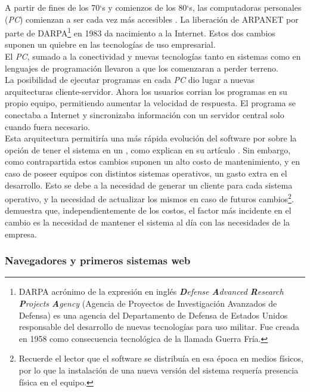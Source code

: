 A partir de fines de los 70`s y comienzos de los 80`s, las computadoras personales
(\emph{PC}) comienzan a ser cada vez más accesibles .
La liberación de ARPANET por parte de DARPA\footnote{
	DARPA acrónimo de la expresión en inglés \emph{\textbf{D}efense \textbf{A}dvanced
	\textbf{R}esearch \textbf{P}rojects \textbf{A}gency} (Agencia de Proyectos de
	Investigación Avanzados de Defensa) es una agencia del Departamento de Defensa de
	Estados Unidos responsable del desarrollo de nuevas tecnologías para uso militar.
	Fue creada en 1958 como consecuencia tecnológica de la llamada Guerra Fría.
} en 1983 da nacimiento a la Internet. Estos dos cambios suponen un quiebre
en las tecnologías de uso empresarial.\\
El \emph{PC}, sumado a la conectividad y nuevas tecnologías tanto en sistemas como en
lenguajes de programación llevaron a que los \mainframes comenzaran
a perder terreno.\\
La posibilidad de ejecutar programas en cada \emph{PC} dio lugar a nuevas arquitecturas
cliente-servidor. Ahora los usuarios corrian los programas en su propio equipo, permitiendo
aumentar la velocidad de respuesta. El programa se conectaba a Internet y sincronizaba
información con un servidor central solo cuando fuera necesario.\\
Esta arquitectura permitiría una más rápida evolución del software por sobre la opción de
tener el sistema en un \mainframe, como explican   en su
artículo . Sin embargo, como contrapartida  estos cambios
suponen un alto costo de mantenimiento, y en caso de poseer equipos con distintos sistemas
operativos, un gasto extra en el desarrollo. Esto se debe a la necesidad de generar un
cliente para cada sistema operativo, y la necesidad de actualizar los mismos en caso de
futuros cambios\footnote{
	Recuerde el lector que el software se distribuía en esa época en medios físicos, por
	lo que la instalación de una nueva versión del sistema requería presencia física en el
	equipo.
}.
demuestra que, independientemente de los costos, el factor más incidente en el cambio es la
necesidad de mantener el sistema al día con las necesidades de la empresa.

\subsubsection{Navegadores y primeros sistemas web}
\label{subsubsec:intro:about_web:web}


